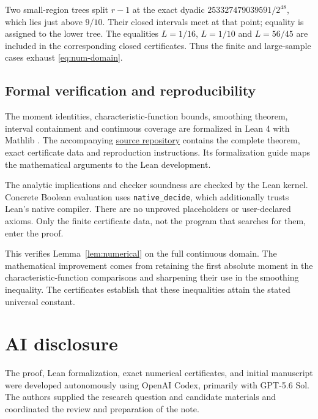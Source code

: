 \documentclass[11pt]{article}
\begin{document}
Two small-region trees split \(r-1\) at the exact dyadic
\(253327479039591/2^{48}\), which lies just above \(9/10\).
Their closed intervals meet at that point; equality is assigned to
the lower tree. The equalities \(L=1/16\), \(L=1/10\) and \(L=56/45\)
are included in the corresponding closed certificates.
Thus the finite and large-sample cases exhaust \eqref{eq:num-domain}.

\subsection{Formal verification and reproducibility}

The moment identities, characteristic-function bounds, smoothing theorem,
interval containment and continuous coverage are formalized in Lean 4
\cite{demoura2021lean4} with Mathlib \cite{mathlib2020}.
The accompanying \href{https://github.com/haonan-xiao/iid-berry-esseen}{source
repository} contains the complete theorem, exact certificate data and
reproduction instructions. Its formalization guide maps the mathematical
arguments to the Lean development.

The analytic implications and checker soundness are checked by the
Lean kernel. Concrete Boolean evaluation uses \texttt{native\_decide},
which additionally trusts Lean's native compiler. There are no unproved
placeholders or user-declared axioms. Only the finite certificate data,
not the program that searches for them, enter the proof.

This verifies Lemma~\ref{lem:numerical} on the full continuous domain.
The mathematical improvement comes from retaining the first absolute
moment in the characteristic-function comparisons and sharpening their
use in the smoothing inequality. The certificates
establish that these inequalities attain the stated universal constant.

\section*{AI disclosure}

The proof, Lean formalization, exact numerical certificates, and initial
manuscript were developed autonomously using OpenAI Codex, primarily with
GPT-5.6 Sol. The authors supplied the research question and candidate
materials and coordinated the review and preparation of the note.

\begingroup
\footnotesize
\raggedright


\endgroup
\end{document}
